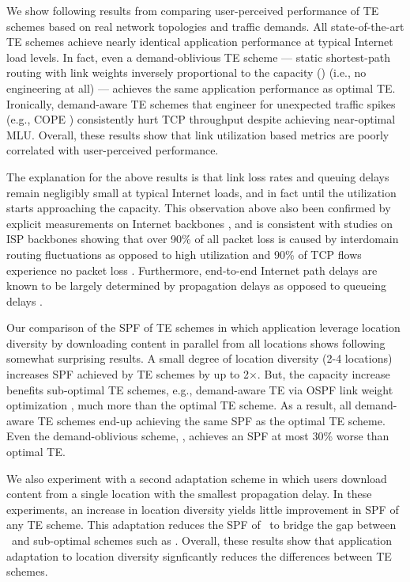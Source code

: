 We show following results from comparing user-perceived performance of TE schemes based on real network topologies and traffic demands. All state-of-the-art TE schemes achieve nearly identical application performance at typical Internet load levels. In fact, even a demand-oblivious TE scheme --- static shortest-path routing with link weights inversely proportional to the capacity (\invcap) (i.e., no engineering at all) --- achieves the same application performance as optimal TE. Ironically, demand-aware TE schemes that engineer for unexpected traffic spikes (e.g., COPE \cite{COPE}) consistently hurt TCP throughput despite achieving near-optimal MLU. Overall, these results show that link utilization based metrics are poorly correlated with user-perceived performance.

The explanation for the above results is that link loss rates and queuing delays remain negligibly small at typical Internet loads, and in fact until the utilization starts approaching the capacity. This observation above also been confirmed by explicit measurements on Internet backbones \cite{ExpRouterBuffer}, and is consistent with studies on ISP backbones showing that over 90\% of all packet loss is caused by interdomain routing fluctuations as opposed to high utilization \cite{SprintStudy} and 90\% of TCP flows experience no packet loss \cite{SprintBackbone}. Furthermore, end-to-end Internet path delays are known to be largely determined by propagation delays as opposed to queueing delays \cite{SprintBackbone,SingleHopDelay}.


Our comparison of the SPF of TE schemes in which application leverage location diversity by downloading content in parallel from all locations shows following somewhat surprising results. A small degree of location diversity (2-4 locations) 
increases SPF achieved by TE schemes by up to 2$\times$. But, the capacity increase benefits sub-optimal TE schemes, e.g., demand-aware TE via OSPF link weight optimization  \cite{fortz2000internet}, much more than the optimal TE scheme. As a result, all demand-aware TE schemes end-up achieving the same SPF as the optimal TE scheme. Even the demand-oblivious scheme, \invcap, achieves an SPF at most 30\% worse than optimal TE. 

We also experiment with a second adaptation scheme in which users download content from a single location with the smallest propagation delay. 
In these experiments, an increase in location diversity yields little improvement in SPF of any TE scheme. This adaptation reduces the SPF of \opt\ to bridge the gap between \opt\ and sub-optimal schemes such as \optwt.
Overall, these results show that application adaptation to location diversity signficantly reduces the differences between TE schemes.



